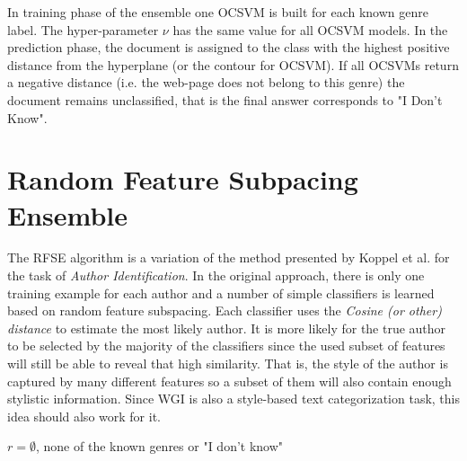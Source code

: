 \hfill

In training phase of the ensemble one OCSVM is built for each known genre label. The hyper-parameter $\nu$ has the same value for all OCSVM models. In the prediction phase, the document is assigned to the class with the highest positive distance from the hyperplane (or the contour for OCSVM). If all OCSVMs return a negative distance (i.e. the web-page does not belong to this genre) the document remains unclassified, that is the final answer corresponds to "I Don't Know".


\section{Random Feature Subpacing Ensemble}\label{chap:openset:sec:RFSE_Description}

The RFSE algorithm is a variation of the method presented by Koppel et al. \parencite{koppel2011authorship} for the task of \textit{Author Identification}. In the original approach, there is only one training example for each author and a number of simple classifiers is learned based on random feature subspacing. Each classifier uses the \textit{Cosine (or other) distance} to estimate the most likely author. It is more likely for the true author to be selected by the majority of the classifiers since the used subset of features will still be able to reveal that high similarity. That is, the style of the author is captured by many different features so a subset of them will also contain enough stylistic information. Since WGI is also a style-based text categorization task, this idea should also work for it.

\hfill

\begin{algorithm}[H]
\caption{The \textit{RFSE} algorithm.}\label{chap:openset:sec:alg:RFS-Ensemble}

{
      $r = \emptyset$, none of the known genres or "I don't know"\;
}
\end{algorithm}

